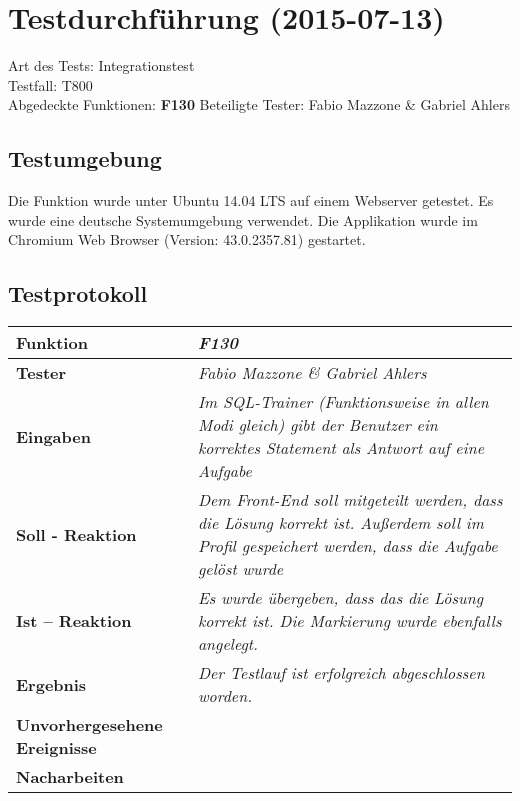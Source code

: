 \chapter{Testdurchführung (2015-07-13)}

Art des Tests: Integrationstest\\
Testfall: T800\\
Abgedeckte Funktionen: \textbf{F130}
Beteiligte Tester: Fabio Mazzone \& Gabriel Ahlers\\

\section{Testumgebung}

Die Funktion wurde unter Ubuntu 14.04 LTS auf einem Webserver  getestet. Es wurde eine deutsche Systemumgebung verwendet. Die Applikation wurde im Chromium Web Browser (Version: 43.0.2357.81) gestartet.

\section{Testprotokoll}

\begin{longtable}{|p{4cm}|p{11cm}|}
\hline
\textbf{Funktion} & \textit{\textbf{F130}} \\
\hline
\textbf{Tester} & \textit{Fabio Mazzone \& Gabriel Ahlers} \\
\hline
\textbf{Eingaben} & \textit{Im SQL-Trainer (Funktionsweise in allen Modi gleich) gibt der Benutzer ein korrektes Statement als Antwort auf eine Aufgabe} \\
\hline
\textbf{Soll - Reaktion} & \textit{Dem Front-End soll mitgeteilt werden, dass die Lösung korrekt ist. Außerdem soll im Profil gespeichert werden, dass die Aufgabe gelöst wurde} \\
\hline
\textbf{Ist -- Reaktion} & \textit{Es wurde übergeben, dass das die Lösung korrekt ist. Die Markierung wurde ebenfalls angelegt.} \\
\hline
\textbf{Ergebnis} & \textit{Der Testlauf ist erfolgreich abgeschlossen worden.} \\
\hline
\textbf{Unvorhergesehene Ereignisse} &
\textit{} \\
\hline
\textbf{Nacharbeiten } & \textit{} \\
\hline
\end{longtable}

